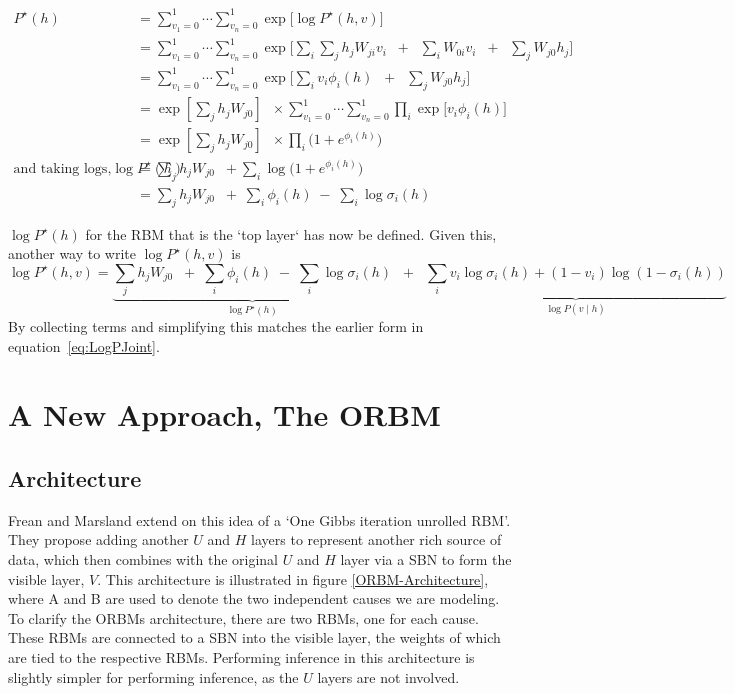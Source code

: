 $$
 \begin{aligned}
P^\star(h) &= \sum_{v_1=0}^1 \cdots \sum_{v_n=0}^1 \exp \bigg[  \log P^{\star}(h,v) \bigg] \\
&= \sum_{v_1=0}^1 \cdots \sum_{v_n=0}^1 \exp \bigg[  \sum_i  \sum_j h_j W_{ji} v_i \;\; + \;\; \sum_i W_{0i} v_i \;\; + \;\; \sum_j W_{j0} h_j \bigg] \\
&= \sum_{v_1=0}^1 \cdots \sum_{v_n=0}^1 \exp \bigg[  \sum_i v_i \phi_i(h)  \;\; + \;\; \sum_j W_{j0} h_j \bigg] \\
&= \exp\left[ \sum_j h_j  W_{j0} \right] \;\; \times \sum_{v_1=0}^1 \cdots \sum_{v_n=0}^1 \prod_i \exp\bigg[ v_i \phi_i(h) \bigg] \\
&= \exp\left[\sum_j h_j  W_{j0}\right] \;\; \times \prod_i \bigg( 1 + e^{\phi_i(h) } \bigg) \\
\text{and taking logs,}
\log P^\star(h) &= \sum_j h_j  W_{j0} \;\; +  \sum_i \log \bigg( 1 + e^{\phi_i(h) } \bigg)
\\
&= \sum_j h_j  W_{j0} \;\; + \; \sum_i \phi_i(h) \;  - \; \sum_i \log \sigma_i(h)
\end{aligned}
$$

$\log P^\star(h)$ for the RBM that is the `top layer` has now be defined. Given this, another way to write $\log P^\star(h,v)$ is
\begin{equation}\label{eq:equivalent-rbm-log-joint}
\log P^\star(h,v) = \underbrace{\sum_j h_j  W_{j0} \;\; + \; \sum_i \phi_i(h) \;  - \; \sum_i \log \sigma_i(h)}_{\log P^\star(h)} \;\;+\;\; \underbrace{\sum_i v_i \log \sigma_i(h) + (1-v_i) \log (1 - \sigma_i(h))}_{\log P(v \mid h)}
\end{equation}
By collecting terms and simplifying this matches the earlier form in equation~\ref{eq:LogPJoint}.


\section{A New Approach, The ORBM}

\subsection{Architecture}

Frean and Marsland extend on this idea of a `One Gibbs iteration unrolled RBM'. They propose adding another $U$ and $H$ layers to represent another rich source of data, which then combines with the original $U$ and $H$ layer via a SBN to form the visible layer, $V$. This architecture is illustrated in figure \ref{ORBM-Architecture}, where A and B are used to denote the two independent causes we are modeling. To clarify the ORBMs architecture, there are two RBMs, one for each cause. These RBMs are connected to a SBN into the visible layer, the weights of which are tied to the respective RBMs. Performing inference in this architecture is slightly simpler for performing inference, as the $U$ layers are not involved.


